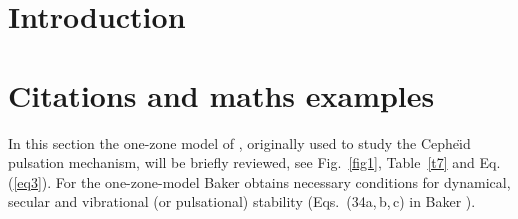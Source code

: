 \documentclass{aa}
\begin{document}
\maketitle


\section{Introduction}
\lipsum[1]
\section{Citations and maths examples}

In this section the one-zone model of \citet{baker},
originally used to study the Cephe{\"{\i}}d pulsation mechanism, will
be briefly reviewed, see Fig.~\ref{fig1}, Table~\ref{t7} and Eq. (\ref{eq3}).
For the one-zone-model Baker obtains necessary conditions
for dynamical, secular and vibrational (or pulsational)
stability (Eqs.\ (34a,\,b,\,c) in Baker \citeyear{baker}).
\end{document}
